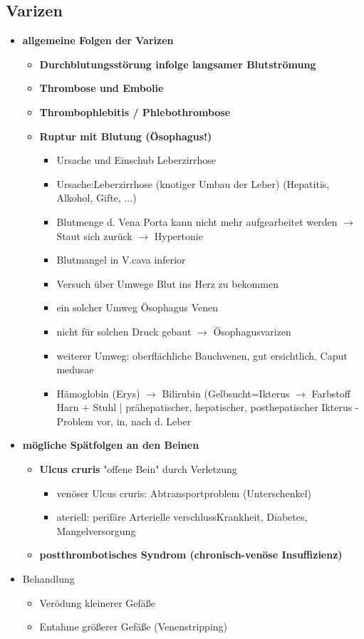 	\subsection{Varizen}
		\begin{itemize}
			\item \textbf{allgemeine Folgen der Varizen}
				\begin{itemize}
					\item \textbf{Durchblutungsstörung infolge langsamer Blutströmung}
					\item \textbf{Thrombose und Embolie}
					\item \textbf{Thrombophlebitis / Phlebothrombose}
					\item \textbf{Ruptur mit Blutung (Ösophagus!)}
						\begin{itemize}
							\item Ursache und Einschub Leberzirrhose
							\item Ursache:Leberzirrhose (knotiger Umbau der Leber) (Hepatitis, Alkohol, Gifte, $\dots$)
							\item Blutmenge d. Vena Porta kann nicht mehr aufgearbeitet werden $\rightarrow$ Staut sich zurück $\rightarrow$ Hypertonie
							\item Blutmangel in V.cava inferior 
							\item Versuch über Umwege Blut ins Herz zu bekommen
							\item ein solcher Umweg Ösophagus Venen 
							\item nicht für solchen Druck gebaut $\rightarrow$ Ösophagusvarizen
							\item weiterer Umweg: oberflächliche Bauchvenen, gut ersichtlich, Caput medusae
							\item Hämoglobin (Erys) $\rightarrow$ Bilirubin (Gelbsucht=Ikterus $\rightarrow$ Farbstoff Harn + Stuhl | prähepatischer, hepatischer, posthepatischer Ikterus - Problem vor, in, nach d. Leber
						\end{itemize}
				\end{itemize}
			\item \textbf{mögliche Spätfolgen an den Beinen}
				\begin{itemize}
					\item \textbf{Ulcus cruris} "offene Bein" durch Verletzung
						\begin{itemize}
							\item venöser Ulcus cruris: Abtransportproblem (Unterschenkel)
							\item ateriell: perifäre Arterielle verschlussKrankheit, Diabetes, Mangelversorgung
						\end{itemize}
					\item \textbf{postthrombotisches Syndrom (chronisch-venöse Insuffizienz)}
				\end{itemize}
			\item Behandlung
				\begin{itemize}
					\item Verödung kleinerer Gefäße
					\item Entahme größerer Gefäße (Venenstripping)
				\end{itemize}
		\end{itemize}
